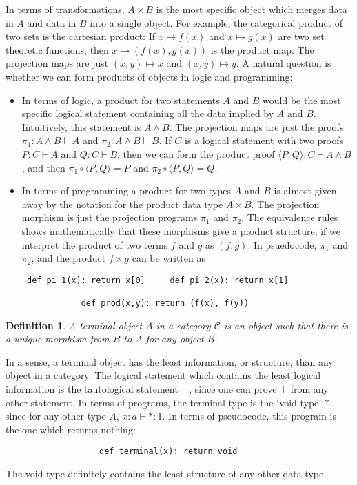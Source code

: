 \documentclass{article}
\theoremstyle{plain}
\newtheorem{definition}{Definition}
\begin{document}
In terms of transformations, $A \times B$ is the most specific object which merges data in $A$ and data in $B$ into a single object. For example, the categorical product of two sets is the cartesian product: If $x \mapsto f(x)$ and $x \mapsto g(x)$ are two set theoretic functions, then $x \mapsto (f(x),g(x))$ is the product map. The projection maps are just $(x,y) \mapsto x$ and $(x,y) \mapsto y$. A natural question is whether we can form products of objects in logic and programming:
%
\begin{itemize}
    \item In terms of logic, a product for two statements $A$ and $B$ would be the most specific logical statement containing all the data implied by $A$ and $B$. Intuitively, this statement is $A \wedge B$. The projection maps are just the proofs $\pi_1: A \wedge B \vdash A$ and $\pi_2: A \wedge B \vdash B$. If $C$ is a logical statement with two proofs $P: C \vdash A$ and $Q: C \vdash B$, then we can form the product proof $\langle P, Q \rangle: C \vdash A \wedge B$, and then $\pi_1\circ \langle P, Q \rangle = P$ and $\pi_2 \circ \langle P, Q \rangle = Q$.

    \item In terms of programming a product for two types $A$ and $B$ is almost given away by the notation for the product data type $A \times B$. The projection morphism is just the projection programs $\pi_1$ and $\pi_2$. The equivalence rules shows mathematically that these morphisms give a product structure, if we interpret the product of two terms $f$ and $g$ as $(f,g)$. In psuedocode, $\pi_1$ and $\pi_2$, and the product $f \times g$ can be written as
    \begin{verbatim} def pi_1(x): return x[0]     def pi_2(x): return x[1]

            def prod(x,y): return (f(x), f(y))
    \end{verbatim}
\end{itemize}

\begin{definition}
    A terminal object $A$ in a category $\mathcal{C}$ is an object such that there is a unique morphism from $B$ to $A$ for any object $B$.
\end{definition}

In a sense, a terminal object has the least information, or structure, than any object in a category. The logical statement which contains the least logical information is the tautological statement $\top$, since one can prove $\top$ from any other statement. In terms of programs, the terminal type is the `void type' $*$, since for any other type $A$, $x:a \vdash *:1$. In terms of pseudocode, this program is the one which returns nothing:
%
\begin{verbatim}                   def terminal(x): return void\end{verbatim}
%
The void type definitely contains the least structure of any other data type.
\end{document}
